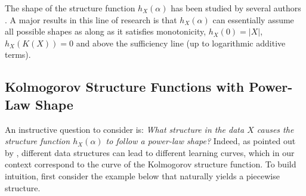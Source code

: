 \documentclass[11pt]{article}
\theoremstyle{plain}
\theoremstyle{definition}
\newtheorem{example}[theorem]{Example}
\newcommand{\entropyrate}{\hat{H}}
\begin{document}
The shape of the structure function $h_X(\alpha)$ has been studied by several authors
\citep{vereshchagin2004kolmogorov,rissanen2005kolmogorov,li2008introduction}.
A major results in this line of research is that $h_X(\alpha)$
can essentially assume all possible shapes as along as it satisfies monotonicity, $h_X(0)=|X|$, $h_X(K(X))=0$
and above the sufficiency line
(up to logarithmic additive terms).


\subsection{Kolmogorov Structure Functions with Power-Law Shape}

An instructive question to consider is:
{\em What structure in the data \(X\) causes the structure function \(h_X(\alpha)\) to follow a power-law shape?} Indeed, as pointed out by \cite{hutter2021learning}, different data structures can lead to different learning curves, which in our context correspond to the curve of the Kolmogorov structure function. To build intuition, first consider the example below that naturally yields a piecewise structure. 

\end{document}
